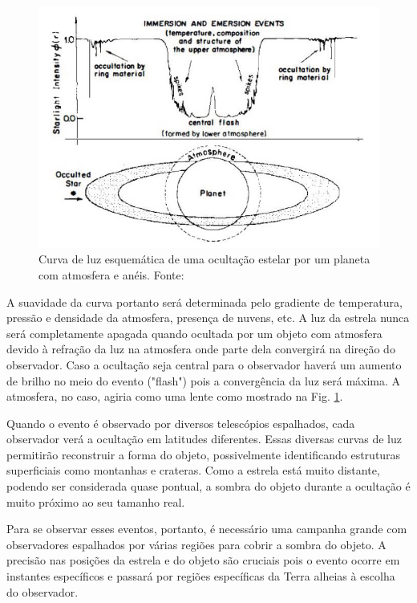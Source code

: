 \documentclass[12pt,a4paper]{monografia}
\begin{document}
\begin{figure}[h]
\begin{centering}
\includegraphics[scale=0.75]{figuras/stellarocc.png} 
\caption{Curva de luz esquemática de uma ocultação estelar por um planeta com atmosfera e anéis. Fonte: \cite{Elliot1979}}
\label{Fig: occ-scheme}
\end{centering} 
\end{figure}

A suavidade da curva portanto será determinada pelo gradiente de temperatura, pressão e densidade da atmosfera, presença de nuvens, etc. A luz da estrela nunca será completamente apagada quando ocultada por um objeto com atmosfera devido à refração da luz na atmosfera onde parte dela convergirá na direção do observador. Caso a ocultação seja central para o observador haverá um aumento de brilho no meio do evento ("flash") pois a convergência da luz será máxima. A atmosfera, no caso, agiria como uma lente como mostrado na Fig. \ref{Fig: occ-scheme}.

Quando o evento é observado por diversos telescópios espalhados, cada observador verá a ocultação em latitudes diferentes. Essas diversas curvas de luz permitirão reconstruir a forma do objeto, possivelmente identificando estruturas superficiais como montanhas e crateras. Como a estrela está muito distante, podendo ser considerada quase pontual, a sombra do objeto durante a ocultação é muito próximo ao seu tamanho real.

Para se observar esses eventos, portanto, é necessário uma campanha grande com observadores espalhados por várias regiões para cobrir a sombra do objeto. A precisão nas posições da estrela e do objeto são cruciais pois o evento ocorre em instantes específicos e passará por regiões específicas da Terra alheias à escolha do observador.
\end{document}
